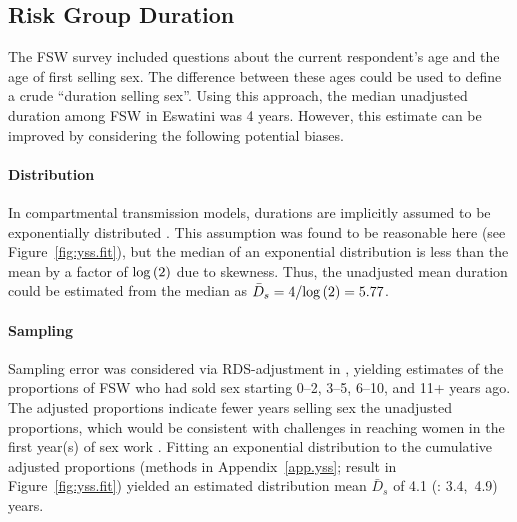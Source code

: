 \subsection{Risk Group Duration}\label{meth.yss} %
The FSW survey \cite{Baral2014} included questions about
the current respondent's age and the age of first selling sex.
The difference between these ages could be used to define a crude ``duration selling sex''.
Using this approach, the median unadjusted duration among FSW in Eswatini was 4 years.
However, this estimate can be improved by considering the following potential biases.
\paragraph{Distribution}
In compartmental transmission models, %
durations are implicitly assumed to be exponentially distributed \cite{?}.
This assumption was found to be reasonable here (see Figure~\ref{fig:yss.fit}),
but the median of an exponential distribution is less than the mean
by a factor of $\mathrm{log}\,(2)$ due to skewness.
Thus, the unadjusted mean duration could be estimated from the median as
$\bar{D}_{s} = 4/\mathrm{log}\,(2) = 5.77$.
\paragraph{Sampling}
Sampling error was considered via RDS-adjustment in \cite{Baral2014},  %
yielding estimates of the proportions of FSW
who had sold sex starting 0--2, 3--5, 6--10, and 11+ years ago.
The adjusted proportions indicate fewer years selling sex \vs the unadjusted proportions,
which would be consistent with
challenges in reaching women in the first year(s) of sex work \cite{Cheuk2020}.
Fitting an exponential distribution to the cumulative adjusted proportions
(methods in Appendix~\ref{app.yss}; result in Figure~\ref{fig:yss.fit})
yielded an estimated distribution mean $\bar{D}_s$ of 4.1 (\ci: 3.4,~4.9) years.
